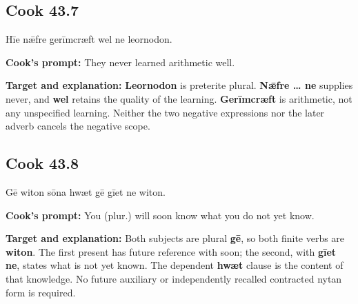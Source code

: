 \par\begin{minipage}{\linewidth}\raggedright
\subsection*{Cook 43.7}

Hīe nǣfre gerīmcræft wel ne leornodon.

\textbf{Cook's prompt:} They never learned arithmetic well.

\textbf{Target and explanation:} \textbf{Leornodon} is preterite plural. \textbf{Nǣfre … ne} supplies never, and \textbf{wel} retains the quality of the learning. \textbf{Gerīmcræft} is arithmetic, not any unspecified learning. Neither the two negative expressions nor the later adverb cancels the negative scope.

\end{minipage}\par\addvspace{4pt}

\par\begin{minipage}{\linewidth}\raggedright
\subsection*{Cook 43.8}

Gē witon sōna hwæt gē gīet ne witon.

\textbf{Cook's prompt:} You (plur.) will soon know what you do not yet know.

\textbf{Target and explanation:} Both subjects are plural \textbf{gē}, so both finite verbs are \textbf{witon}. The first present has future reference with soon; the second, with \textbf{gīet ne}, states what is not yet known. The dependent \textbf{hwæt} clause is the content of that knowledge. No future auxiliary or independently recalled contracted nytan form is required.

\end{minipage}\par\addvspace{4pt}

